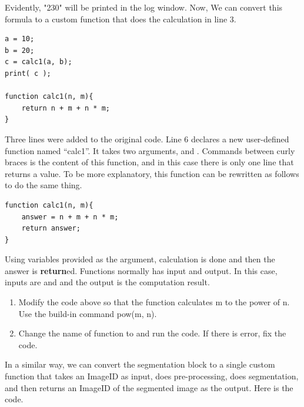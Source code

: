 Evidently, "230" will be printed in the log window. Now, We can convert this formula to a custom function  that does the calculation in line 3.

\begin{lstlisting}[morekeywords={*, function, return}]
a = 10;
b = 20;
c = calc1(a, b);
print( c );

function calc1(n, m){
	return n + m + n * m;
}
\end{lstlisting}

Three lines were added to the original code. Line 6 declares a new user-defined function named ``calc1''. It takes two arguments,  and .  Commands between curly braces is the content of this function, and in this case there is only one line that returns a value. To be more explanatory, this function can be rewritten as follows to do the same thing. 

\begin{lstlisting}[morekeywords={*, function, return}]
function calc1(n, m){
    answer = n + m + n * m;
	return answer;
}
\end{lstlisting}

Using variables provided as the argument, calculation is done and then the answer is \textbf{return}ed. Functions normally has input and output. In this case, inputs are  and  and the output is the computation result. 

\begin{indentexercise}{5}
\begin{enumerate}
\item Modify the code above so that the function  calculates m to the power of n. Use the build-in command pow(m, n). 

\item Change the name of function to  and run the code. If there is error, fix the code. 
\end{enumerate}

\end{indentexercise}

In a similar way, we can convert the segmentation block to a single custom function that takes an ImageID as input, does pre-processing, does segmentation, and then returns an ImageID of the segmented image as the output. Here is the code. 



